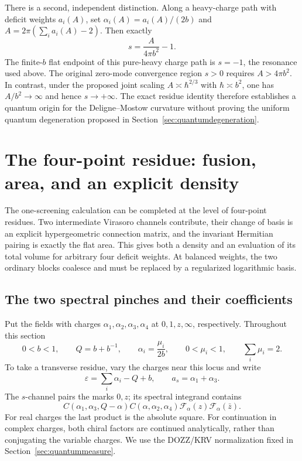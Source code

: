 \documentclass[11pt,a4paper]{article}
\numberwithin{equation}{section}
\theoremstyle{definition}
\theoremstyle{remark}
\begin{document}
There is a second, independent distinction. Along a heavy-charge
path with deficit weights $a_i(A)$, set
$\alpha_i(A)=a_i(A)/(2b)$ and
$A=2\pi(\sum_i a_i(A)-2)$. Then exactly
\begin{equation}
 \boxed{\quad s=\frac{A}{4\pi b^2}-1.\quad}
 \label{eq:areaLiouvillecharge}
\end{equation}
The finite-$b$ flat endpoint of this pure-heavy charge path is
$s=-1$, the resonance used
above. The original zero-mode convergence region $s>0$
requires $A>4\pi b^2$. In contrast, under the proposed joint
scaling $A\asymp\hbar^{2/3}$ with $\hbar\asymp b^2$, one
has $A/b^2\to\infty$ and hence $s\to+\infty$.
The exact residue identity therefore establishes a quantum
origin for the Deligne--Mostow curvature without proving the
uniform quantum degeneration proposed in
Section~\ref{sec:quantumdegeneration}.

\section{The four-point residue: fusion, area, and an explicit density}
\label{sec:screenedfusion}

The one-screening calculation can be completed at the level of
four-point residues. Two intermediate Virasoro channels contribute,
their change of basis is an explicit hypergeometric connection
matrix, and the invariant Hermitian pairing is exactly the flat
area. This gives both a density and an evaluation of its total
volume for arbitrary four deficit weights. At balanced weights,
the two ordinary blocks coalesce and must be replaced by a
regularized logarithmic basis.

\subsection{The two spectral pinches and their coefficients}

Put the fields with charges $\alpha_1,\alpha_2,\alpha_3,\alpha_4$
at $0,1,z,\infty$, respectively. Throughout this section
\begin{equation}
 0<b<1,\qquad Q=b+b^{-1},\qquad
 \alpha_i=\frac{\mu_i}{2b},\qquad
 0<\mu_i<1,\qquad \sum_i\mu_i=2.
 \label{eq:screeningparameters}
\end{equation}
To take a transverse residue, vary the charges near this locus
and write
\begin{equation}
 \varepsilon=\sum_i\alpha_i-Q+b,\qquad
 a_s=\alpha_1+\alpha_3.
 \label{eq:screeningtransverse}
\end{equation}
The $s$-channel pairs the marks $0,z$; its spectral integrand
contains
\[
 C(\alpha_1,\alpha_3,Q-\alpha)
 C(\alpha,\alpha_2,\alpha_4)
 \mathcal F_\alpha(z)\mathcal F_\alpha(\bar z).
\]
For real charges the last product is the absolute square.
For continuation in complex charges, both chiral factors are
continued analytically, rather than conjugating the variable
charges. We use the DOZZ/KRV normalization fixed in
Section~\ref{sec:quantummeasure}.
\end{document}
